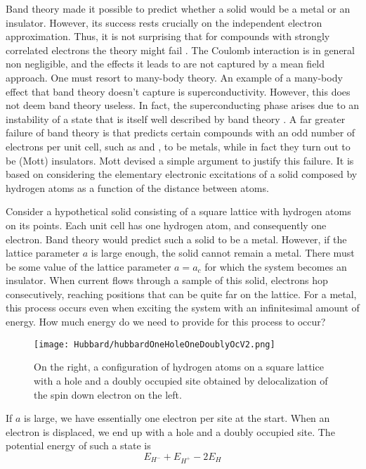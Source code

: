 Band theory made it possible to predict whether a solid would be a metal or an insulator.
However, its success rests crucially on the independent electron approximation.
Thus, it is not surprising that for compounds with strongly correlated electrons the theory might fail \cite{mila_physique_2007}.
The Coulomb interaction is in general non negligible, and the effects it leads to are not captured by a mean field approach.
One must resort to many-body theory.
An example of a many-body effect that band theory doesn't capture is  superconductivity.
However, this does not deem band theory useless.
In fact, the superconducting phase arises due to an instability of a state that is itself well described by band theory \cite{gennes_superconductivity_1999}.
A far greater failure of band theory is that predicts certain compounds with an odd number of electrons per unit cell, such as  and ,  to be metals, while in fact  they turn out to be (Mott) insulators.
Mott devised a simple argument to justify this failure.
It is based on considering the elementary electronic excitations of a solid composed by hydrogen atoms as a function of the distance between atoms.

Consider a hypothetical solid consisting of a square lattice with hydrogen atoms on its points.
Each unit cell has one hydrogen atom, and consequently one electron.
Band theory would predict such a solid to be a metal.
However, if the lattice parameter $a$ is large enough, the solid cannot remain a metal.
There must be some value of the lattice parameter $a = a_c$ for which the system becomes an insulator.
When current flows through a sample of this solid, electrons hop consecutively, reaching positions that can be quite far on the lattice.
For a metal, this process occurs even when exciting the system with an infinitesimal amount of energy.
How much energy do we need to provide for this process to occur?

\begin{figure}[ht!]\label{hubbardOneHoleOneDoublyOc}
\centering
\texttt{[image: Hubbard/hubbardOneHoleOneDoublyOcV2.png]}
\caption[Configuration of the Hubbard model on the square lattice with a hole and a doubly occupied site.]{On the right, a configuration of hydrogen atoms on a square lattice with a hole and a doubly occupied site obtained by delocalization of the spin down electron on the left.}
\end{figure}

If $a$ is large, we have essentially one electron per site at the start.
When an electron is displaced, we end up with a hole and a doubly occupied site.
The potential energy of such a state is
\begin{equation}
E_{H^-} + E_{H^+} - 2 E_H 
\end{equation}

